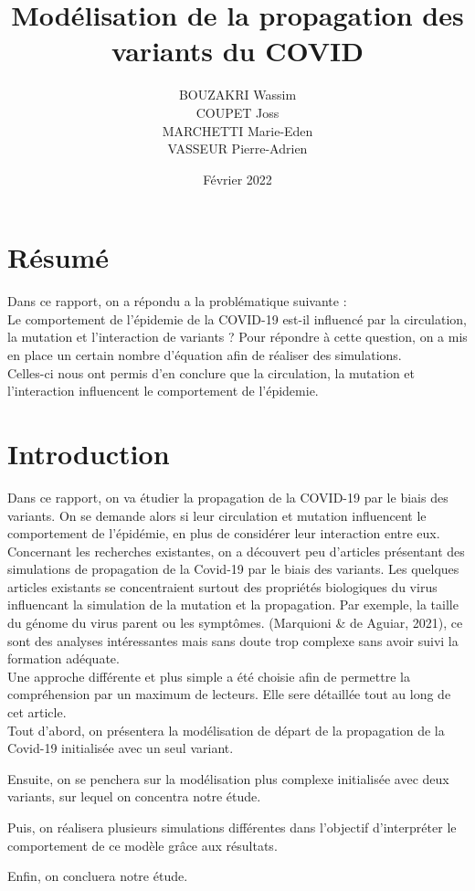 \documentclass{article}
\title{Modélisation de la propagation des variants du COVID}
\author{BOUZAKRI Wassim \\COUPET Joss \\MARCHETTI Marie-Eden \\VASSEUR Pierre-Adrien}
\date{Février 2022}
\begin{document}
\maketitle

\section{Résumé}

Dans ce rapport, on a répondu a la problématique suivante :\\
Le comportement de l'épidemie de la COVID-19 est-il influencé par la circulation, la mutation et l'interaction de variants ?
Pour répondre à cette question, on a mis en place un certain nombre d'équation afin de réaliser des simulations. \\Celles-ci nous ont permis d'en conclure que la circulation, la mutation et l'interaction influencent le comportement de l'épidemie.

\section{Introduction}

Dans ce rapport, on va étudier la propagation de la COVID-19 par le biais des variants.
On se demande alors si leur circulation et mutation influencent le comportement de l'épidémie, en plus de considérer leur interaction entre eux.\\

\noindent
Concernant les recherches existantes, on a découvert peu d'articles présentant des simulations de propagation de la Covid-19 par le biais des variants.
Les quelques articles existants se concentraient surtout des propriétés biologiques du virus influencant la simulation de la mutation et la propagation.
Par exemple, la taille du génome du virus parent ou les symptômes. (Marquioni \& de Aguiar, 2021), ce sont des analyses intéressantes mais sans doute trop complexe sans avoir suivi la formation adéquate.\\

\noindent
Une approche différente et plus simple a été choisie afin de permettre la compréhension par un maximum de lecteurs. Elle sere détaillée tout au long de cet article.\\

\noindent
Tout d'abord, on présentera la modélisation de départ de la propagation de la Covid-19 initialisée avec un seul variant. \par
Ensuite, on se penchera sur la modélisation plus complexe initialisée avec deux variants, sur lequel on concentra notre étude.\par
Puis, on réalisera plusieurs simulations différentes dans l'objectif d'interpréter le comportement de ce modèle grâce aux résultats.\par
Enfin, on concluera notre étude.\\
\end{document}
